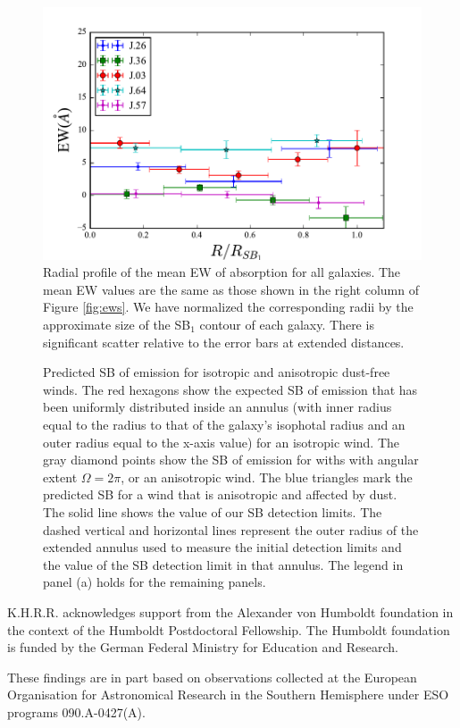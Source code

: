 \documentclass[twocolumn]{aastex61}
\begin{document}
\begin{figure}[!htb]
\centering
\includegraphics[scale=0.9]{../Figures/ew_comb.pdf}
\caption{Radial profile of the mean EW of  absorption for all galaxies. The mean EW values are the same as those shown in the right column of Figure \ref{fig:ews}. We have normalized the corresponding radii by the approximate size of the SB$_1$ contour of each galaxy. There is significant scatter relative to the error bars at extended distances.}
\label{fig:ew_comb}
\end{figure}

\begin{figure}[h]
\centering
{}
\caption{Predicted SB of  emission for isotropic and anisotropic dust-free winds. The red hexagons show the expected SB of emission that has been uniformly distributed inside an annulus (with inner radius equal to the radius to that of the galaxy's isophotal radius and an outer radius equal to the x-axis value) for an isotropic wind. The gray diamond points show the SB of  emission for withs with angular extent $\Omega=2\pi$, or an anisotropic wind. The blue triangles mark the predicted SB for a wind that is anisotropic and affected by dust. The solid line shows the value of our SB detection limits. The dashed vertical and horizontal lines represent the outer radius of the extended annulus used to measure the initial detection limits and the value of the SB detection limit in that annulus. The legend in panel (a) holds for the remaining panels.}
\label{fig.emission}
\end{figure}

\acknowledgements

K.H.R.R. acknowledges support from the Alexander von Humboldt foundation in the context of the Humboldt Postdoctoral Fellowship.  The Humboldt foundation is funded by the German Federal Ministry for Education and Research.

These findings are in part based on observations collected at the
European Organisation for Astronomical Research in the Southern
Hemisphere under ESO programs 090.A-0427(A).


\end{document}
